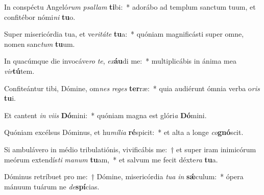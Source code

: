 \item In conspéctu Angeló\textit{rum} \textit{psal}\textit{lam} \textbf{ti}bi:~* adorábo ad templum sanctum tuum, et confitébor nómi\textit{ni} \textbf{tu}o.
\item Super misericórdia tua, et ve\textit{ri}\textit{tá}\textit{te} \textbf{tu}a:~* quóniam magnificásti super omne, nomen sanc\textit{tum} \textbf{tu}um.
\item In quacúmque die invocáve\textit{ro} \textit{te}, \textit{ex}\textbf{áu}di me:~* multiplicábis in ánima mea \textit{vir}\textbf{tú}tem.
\item Confiteántur tibi, Dómine, om\textit{nes} \textit{re}\textit{ges} \textbf{ter}ræ:~* quia audiérunt ómnia verba o\textit{ris} \textbf{tu}i.
\item Et cantent \textit{in} \textit{vi}\textit{is} \textbf{Dó}mini:~* quóniam magna est glóri\textit{a} \textbf{Dó}mini.
\item Quóniam excélsus Dóminus, et hu\textit{mí}\textit{li}\textit{a} \textbf{ré}spicit:~* et alta a longe \textit{co}\textbf{gnó}scit.
\item Si ambulávero in médio tribulatiónis, vivificábis me:~† et super iram inimicórum meórum extendís\textit{ti} \textit{ma}\textit{num} \textbf{tu}am,~* et salvum me fecit déxte\textit{ra} \textbf{tu}a.
\item Dóminus retríbuet pro me:~† Dómine, misericórdia \textit{tu}\textit{a} \textit{in} \textbf{sǽ}culum:~* ópera mánuum tuárum ne \textit{de}\textbf{spí}cias.
